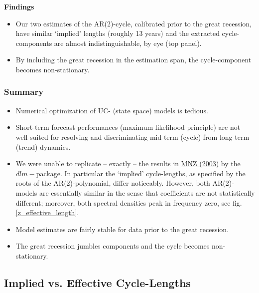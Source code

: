 \documentclass[a4paper]{book}
\begin{document}
\textbf{Findings}
\begin{itemize}
\item Our two estimates of the AR(2)-cycle, calibrated prior to the great recession, have similar `implied' lengths (roughly 13 years) and the extracted cycle-components are almost indistinguishable, by eye (top panel). 
\item By including the great recession in the estimation span, the cycle-component becomes non-stationary. 
\end{itemize}

\subsubsection{Summary}
\begin{itemize}
\item Numerical optimization of UC- (state space) models is tedious.
\item Short-term forecast performances (maximum likelihood principle) are not well-suited for resolving and discriminating mid-term (cycle) from long-term (trend) dynamics.
\item We were unable to replicate -- exactly -- the results in \href{https://www.dropbox.com/s/1qn5h7s02c86j8i/mnz03.pdf?dl=0}{MNZ (2003)} by the $dlm-$package. In particular the `implied' cycle-lengths, as specified by the roots of the AR(2)-polynomial, differ noticeably. However, both AR(2)-models are essentially similar in the sense that coefficients are not statistically different; moreover, both spectral densities peak in frequency zero, see fig.\ref{z_effective_length}.   
\item Model estimates are fairly stable for data prior to the great recession. 
\item The great recession jumbles components and the cycle becomes non-stationary.
\end{itemize}



\subsection{Implied vs. Effective Cycle-Lengths}\label{cf_cr_a_e_cl}
\end{document}
